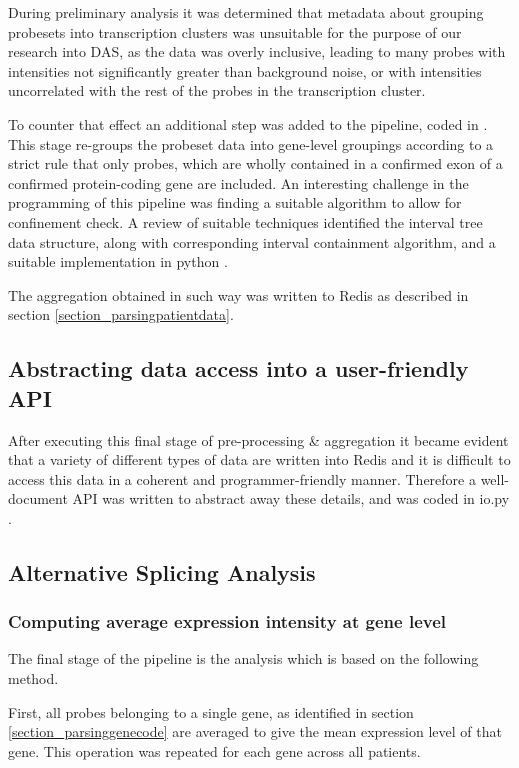 During preliminary analysis it was determined that metadata about grouping probesets into transcription clusters was unsuitable for the purpose of our research into DAS, as the data was overly inclusive, leading to many probes with intensities not significantly greater than background noise, or with intensities uncorrelated with the rest of the probes in the transcription cluster.

To counter that effect an additional step was added to the pipeline, coded in \cite{ComputeAS22017}. This stage re-groups the probeset data into gene-level groupings according to a strict rule that only probes, which are wholly contained in a confirmed exon of a confirmed protein-coding gene are included. An interesting challenge in the programming of this pipeline was finding a suitable algorithm to allow for confinement check. A review of suitable techniques identified the interval tree data structure, along with corresponding interval containment algorithm, and a suitable implementation in python \parencite{intervaltree2013}.

The aggregation obtained in such way was written to Redis as described in section \ref{section_parsingpatientdata}.

\subsection{Abstracting data access into a user-friendly API}

After executing this final stage of pre-processing \& aggregation it became evident that a variety of different types of data are written into Redis and it is difficult to access this data in a coherent and programmer-friendly manner. Therefore a well-document API was written to abstract away these details, and was coded in io.py \parencite{io2017}.

\subsection{Alternative Splicing Analysis}

\subsubsection{Computing average expression intensity at gene level}

The final stage of the pipeline is the analysis which is based on the following method.

First, all probes belonging to a single gene, as identified in section \ref{section_parsinggenecode} are averaged to give the mean expression level of that gene. This operation was repeated for each gene across all patients.


